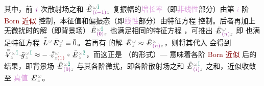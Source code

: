 其中，前 $\textcolor{Plum}{i}$ 次\textcolor{NavyBlue}{散射场}之和 $\xint{\mathcolor{gray}{-}}{255}{\tilde{E}}^{\;\! \mathcolor{gray}{\omega} \textcolor{PineGreen}{\hat{1}}}_{\;\! \textcolor{Plum}{(i-1)} \mathcolor{gray}{z}}$ \textcolor{PineGreen}{复振幅}的\textcolor{Plum}{增长率}（即\textcolor{Plum}{非线性}部分）由第 \textcolor{Plum}{$i$} 阶 \textcolor{Maroon}{Born 近似}  控制，\textcolor{PineGreen}{本征值}和\textcolor{PineGreen}{偏振态}（即\textcolor{Plum}{线性}部分）由\textcolor{PineGreen}{特征方程}  控制。后者再加上\textcolor{NavyBlue}{无微扰}时的解（即\textcolor{NavyBlue}{背景场}）$\xint{\mathcolor{gray}{-}}{255}{\bar{E}}^{\;\! \mathcolor{gray}{\omega} \textcolor{PineGreen}{\hat{2}}}_{\;\! \textcolor{Plum}{(0)} \mathcolor{gray}{z}}$ 也满足相同的\textcolor{PineGreen}{特征方程} ，可推出 $\xint{\mathcolor{gray}{-}}{255}{\bar{E}}^{\;\! \mathcolor{gray}{\omega} }_{\;\! \textcolor{Plum}{(n)} \mathcolor{gray}{z}}$ 即  也满足\textcolor{PineGreen}{特征方程} $\xint{\mathcolor{gray}{-}}{30}{\bar{\bar{L}}}^{\;\! \mathcolor{gray}{\omega} } \xint{\mathcolor{gray}{-}}{255}{\bar{E}}^{\;\! \mathcolor{gray}{\omega} }_{\;\! \mathcolor{gray}{z}} \equiv \bar{0}$。若再有  的解 $\xint{\mathcolor{gray}{-}}{255}{\bar{E}}^{\;\! \mathcolor{gray}{\omega} }_{\;\! \mathcolor{gray}{z}} \approx \xint{\mathcolor{gray}{-}}{255}{\bar{E}}^{\;\! \mathcolor{gray}{\omega} }_{\;\! \textcolor{Plum}{(n)} \mathcolor{gray}{z}}$，则将其代入  会得到 $\xint{\mathcolor{gray}{-}}{21}{\bar{\bar{V}}}^{\;\! \mathcolor{gray}{\omega} \textcolor{PineGreen}{\hat{1}}}_{\;\! \mathcolor{gray}{z}} \xint{{}^{}_{\mathcolor{gray}{-}}}{10}{\bar{g}}^{\;\!\mathcolor{gray}{\omega} \textcolor{PineGreen}{\hat{1}}}_{\;\! \mathcolor{gray}{z}} \approx - \xint{\begin{smallmatrix} ~ \\ {}^{}_{\mathcolor{gray}{-}} \\ ~ \end{smallmatrix}}{16}{\tilde{\tilde{\varepsilon}}}^{\;\! \mathcolor{gray}{\omega}}_{\mathcolor{gray}{z} \textcolor{Maroon}{(1)}} \mathcolor{gray}{*} \xint{\mathcolor{gray}{-}}{255}{\bar{E}}^{\;\! \mathcolor{gray}{\omega} \textcolor{PineGreen}{\hat{2}}}_{\;\! \mathcolor{gray}{z}}$，而这正是 （的形式）--- 意味着各阶 \textcolor{Maroon}{Born 近似} 后的结果，即\textcolor{NavyBlue}{背景场} $\xint{\mathcolor{gray}{-}}{255}{\bar{E}}^{\;\! \mathcolor{gray}{\omega} \textcolor{PineGreen}{\hat{2}}}_{\;\! \textcolor{Plum}{(0)} \mathcolor{gray}{z}}$ 与其各阶\textcolor{NavyBlue}{微扰}，即各阶\textcolor{NavyBlue}{散射场}之和 $\xint{\mathcolor{gray}{-}}{255}{\tilde{E}}^{\;\! \mathcolor{gray}{\omega} \textcolor{PineGreen}{\hat{1}}}_{\;\! \textcolor{Plum}{(i)} \mathcolor{gray}{z}}$ 之和，近似收敛至 \textcolor{Plum}{真值} $\xint{\mathcolor{gray}{-}}{255}{\bar{E}}^{\;\! \mathcolor{gray}{\omega} }_{\;\! \mathcolor{gray}{z}}$。

